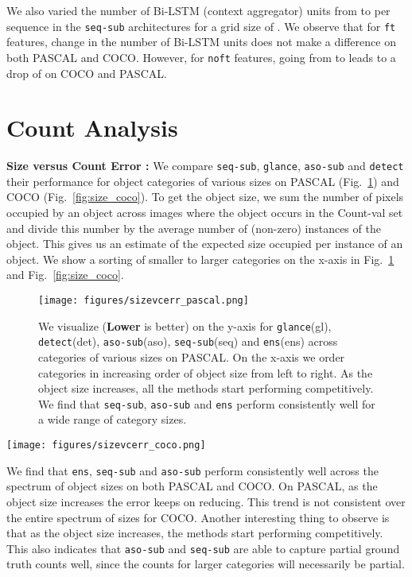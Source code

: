 \documentclass[10pt,twocolumn,letterpaper]{article}
\newcommand{\detect}{\texttt{detect}\xspace}
\newcommand{\sub}{\texttt{aso-sub}\xspace}
\newcommand{\seq}{\texttt{seq-sub}\xspace}
\newcommand{\glance}{\texttt{glance}\xspace}
\newcommand{\ens}{\texttt{ens}\xspace}
\newcommand{\reffig}[1]{Fig.~\ref{#1}}
\begin{document}
We also varied the number of Bi-LSTM (context aggregator) units from  to  per sequence in the \seq architectures for a grid size of . We observe that for \texttt{ft} features, change in the number of Bi-LSTM units does not make a difference on both PASCAL and COCO. However, for \texttt{noft} features, going from  to  leads to a drop of   on COCO and PASCAL.




 
\section{Count Analysis}\label{sec:under_over}
\textbf{Size versus Count Error : }
We compare \seq, \glance, \sub and \detect their performance for object categories of various sizes on PASCAL (\reffig{fig:size_pascal}) and COCO (\reffig{fig:size_coco}). To get the object size, we sum the number of pixels occupied by an object across images where the object occurs in the Count-val set and divide this number by the average number of (non-zero) instances of the object. This gives us an estimate of the expected size occupied per instance of an object. We show a sorting of smaller to larger categories on the x-axis in \reffig{fig:size_pascal} and \reffig{fig:size_coco}. 
\begin{figure}
\texttt{[image: figures/sizevcerr\_pascal.png]}
\caption{We visualize  (\textbf{Lower} is better) on the y-axis for \glance (gl), \detect (det), \sub (aso), \seq (seq) and \ens (ens) across categories of various sizes on PASCAL. On the x-axis we order categories in increasing order of object size from left to right. As the object size increases, all the methods start performing competitively. We find that \seq, \sub and \ens perform consistently well for a wide range of category sizes.}
\label{fig:size_pascal}
\end{figure}
\begin{figure*}
\texttt{[image: figures/sizevcerr\_coco.png]}
\caption{We visualize  (\textbf{Lower} is better) on the y-axis for \glance (gl), \detect (det), \sub (aso), \seq (seq) and \ens (ens) across categories of various sizes on COCO. On the x-axis we order categories in increasing order of object size from left to right. We find that \seq, \sub and \ens perform consistently well for a wide range of category sizes.}
\label{fig:size_coco}
\end{figure*}
We find that \ens, \seq and \sub perform consistently well across the spectrum of object sizes on both PASCAL and COCO. On PASCAL, as the object size increases the error keeps on reducing. This trend is not consistent over the entire spectrum of sizes for COCO. Another interesting thing to observe is that as the object size increases, the methods start performing competitively. This also indicates that \sub and \seq are able to capture partial ground truth counts well, since the counts for larger categories will necessarily be partial.
\end{document}
